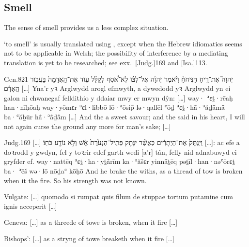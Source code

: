 \subsection{Smell}

{\click} The sense of smell provides us a less complex situation.




\begin{paper}
	 ‘to smell’ is usually translated using , except when the Hebrew idiomatics seems not to be applicable in Welsh; the possibility of interference by a mediating translation is yet to be researched; see exx.~\vref{Judg.}{16}{9}{} and \vref{Isa.}{11}{3}{}.
\end{paper}

\begin{example}{Gen.}{8}{21}{}{}
	\quoling
	{ יְהוָה֮ אֶת־רֵ֣יחַ הַנִּיחֹחַ֒ וַיֹּ֨אמֶר יְהוָ֜ה אֶל־לִבּ֗וֹ לֹֽא־אֹ֠סִף לְקַלֵּ֨ל ע֤וֹד אֶת־הָֽאֲדָמָה֙ בַּעֲב֣וּר הָֽאָדָ֔ם […]}
	{Yna’r  yꝛ Arglwydd arogl eſmwyth, a dywedodd yꝛ Arglwydd yn ei galon ni chwanegaf felldithio y ddaiar mwy er mwyn dŷn: […]}
	{way· {\YHWH} ʾɛṯ·rēaḥ han·nīḥōaḥ way·yōmɛr {\YHWH} ʾɛl·libbō lō·ʾōsip̄ lə·qallēl ʿōḏ ʾɛṯ·hå̄·ʾăḏå̄må̄ ba·ʿăḇūr hå̄·ʾå̄ḏå̄m […]}
	{And the {\LORD}  a sweet savour; and the {\LORD} said in his heart, I will not again curse the ground any more for man’s sake; […]}
\end{example}

\begin{example}{Judg.}{16}{9}{}{}
	\quoling
	{[…] וַיְנַתֵּק֙ אֶת־הַיְתָרִ֔ים כַּאֲשֶׁ֨ר יִנָּתֵ֤ק פְּתִֽיל־הַנְּעֹ֙רֶת֙  אֵ֔שׁ וְלֹ֥א נוֹדַ֖ע כֹּחֽוֹ׃}
	{[…]: ac efe a doꝛrodd y gwdyn, fel y toꝛrir edef garth wedi  [a’r] tân, felly nid adnabuwyd ei gryfder ef.}
	{way·nattēq ʾɛṯ·ha·yṯå̄rīm ka·ʾăšɛr yinnå̄ṯēq pəṯīl·han·nəʿōrɛṯ ba· ʾēš wə·lō nōḏaʿ kōḥō}
	{And he brake the withs, as a thread of tow is broken when it  the fire. So his strength was not known.}
\end{example}
\begin{compactdesc}\small
	\item [Vulgate:] […] quomodo si rumpat quis filum de stuppae tortum putamine cum  ignis acceperit […]
	\item [Geneva:] […] as a threede of towe is broken, when it  fire […]
	\item [Bishops’:] […] as a stryng of towe breaketh when it  fire […]
\end{compactdesc}


